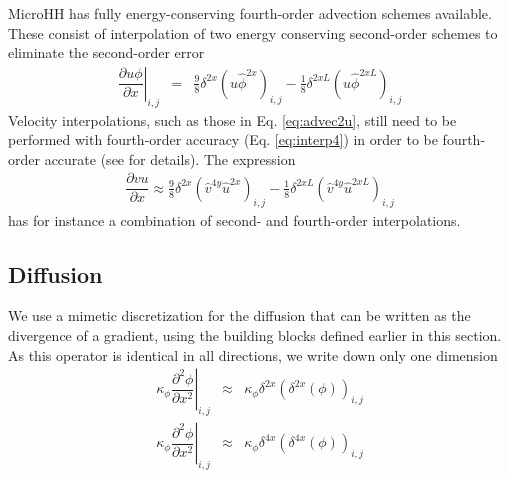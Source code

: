 \documentclass[gmd]{copernicus}
\begin{document}
MicroHH has fully energy-conserving fourth-order advection schemes \citep{Morinishi1998} available. These consist of interpolation of two energy conserving second-order schemes to eliminate the second-order error
\begin{eqnarray}
\left. \dfrac{\partial u \phi}{\partial x} \right|_{i,j} & = & \frac{9}{8} \delta^{2x} \left( u \widehat{\phi}^{2x} \right)_{i,j} 
                                                             - \frac{1}{8} \delta^{2xL} \left( u \widehat{\phi}^{2xL} \right)_{i,j}%
\end{eqnarray}
Velocity interpolations, such as those in Eq. \ref{eq:advec2u}, still need to be performed with fourth-order accuracy (Eq. \ref{eq:interp4}) in order to  be fourth-order accurate (see \citet{Morinishi1998} for details). The expression
\begin{eqnarray}
\dfrac{\partial v u}{\partial x} \approx \frac{9}{8} \delta^{2x} \left( \widehat{v}^{4y} \widehat{u}^{2x} \right)_{i,j} 
                                       - \frac{1}{8} \delta^{2xL} \left( \widehat{v}^{4y} \widehat{u}^{2xL} \right)_{i,j}
\end{eqnarray}
has for instance a combination of second- and fourth-order interpolations.

\subsection{Diffusion}
We use a mimetic discretization for the diffusion that can be written as the divergence of a gradient, using the building blocks defined earlier in this section. As this operator is identical in all directions, we write down only one dimension
\begin{eqnarray}
\left. \kappa_\phi \dfrac{\partial^2 \phi}{\partial x^2}\right|_{i,j} & \approx &
\kappa_\phi \delta^{2x} \left( \delta^{2x} \left( \phi \right) \right)_{i,j}\\
\left. \kappa_\phi \dfrac{\partial^2 \phi}{\partial x^2}\right|_{i,j} & \approx &
\kappa_\phi \delta^{4x} \left( \delta^{4x} \left( \phi \right) \right)_{i,j}
\end{eqnarray}
\end{document}
